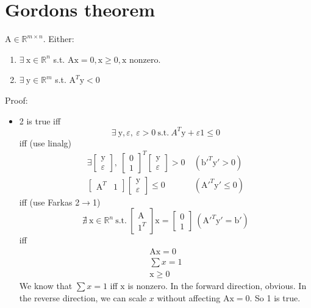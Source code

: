 \documentclass[6pt]{article}
\def\x{\textrm{x}}
\def\y{\textrm{y}}
\def\b{\textrm{b}}
\def\A{\textrm{A}}
\def\suchthat{\textrm{s.t.} }
\begin{document}
\section{Gordons theorem}
$\A\in\mathbb{R}^{m\times n}$. Either:
\begin{enumerate}
    \item $\exists~\x \in \mathbb{R}^n$ s.t. $\A\x=0, \x\geq 0, \x$ nonzero.
    \item $\exists~ \y \in \mathbb{R}^m$ s.t. $\A^T\y<0$
\end{enumerate}{}
Proof:
\begin{itemize}
    \item 2 is true iff $$\exists~\y, \varepsilon,~\varepsilon>0 ~\suchthat~A^T\y+\varepsilon 1 \leq 0$$
    iff (use linalg)
    \begin{align*}
        \exists\begin{bmatrix}\y\\\varepsilon\end{bmatrix},~\begin{bmatrix}0\\1\end{bmatrix}^T\begin{bmatrix}\y\\ \varepsilon\end{bmatrix}>0 &~(\b'^T\y'>0)\\
        \begin{bmatrix}\A^T& 1\end{bmatrix}\begin{bmatrix}\y\\\varepsilon\end{bmatrix} \leq 0 &~ (\A'^T\y'\leq 0)
    \end{align*}{}
    iff (use Farkas 2$\to$1)
    $$\nexists~ \x \in \mathbb{R}^n~\suchthat{}~\begin{bmatrix}\A\\ 1^T\end{bmatrix}\x = \begin{bmatrix}0\\1\end{bmatrix}~(\A'^T\y'=\b')$$
    iff
    \begin{align*}
        \A\x=0\\
        \sum x = 1\\
        \x \geq 0
    \end{align*}
    We know that $\sum x = 1$ iff $\x$ is nonzero. In the forward direction, obvious. In the reverse direction, we can scale $x$ without affecting $\A\x=0$. So 1 is true.
\end{itemize}{}
\end{document}

